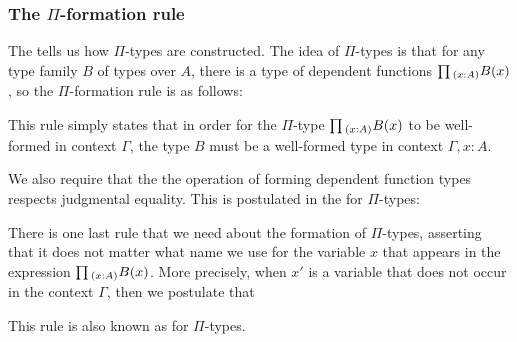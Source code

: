 \subsubsection{The $\Pi$-formation rule}
The  tells us how $\Pi$-types are constructed. The idea of $\Pi$-types is that for any type family $B$ of types over $A$, there is a type of dependent functions $\prd{x:A}B(x)$, so the $\Pi$-formation rule is as follows:
\begin{prooftree}
\end{prooftree}
This rule simply states that in order for the $\Pi$-type $\prd{x:A}B(x)$ to be well-formed in context $\Gamma$, the type $B$ must be a well-formed type in context $\Gamma,x:A$.

We also require that the the operation of forming dependent function types respects judgmental equality. This is postulated in the  for $\Pi$-types:
\begin{prooftree}
\end{prooftree}

There is one last rule that we need about the formation of $\Pi$-types, asserting that it does not matter what name we use for the variable $x$ that appears in the expression $\prd{x:A}B(x)$.
More precisely, when $x'$ is a variable that does not occur in the context $\Gamma$, then we postulate that
\begin{prooftree}
\end{prooftree}
This rule is also known as  for $\Pi$-types.

